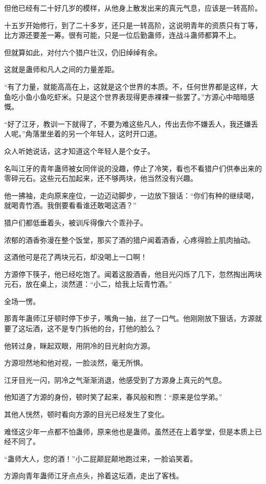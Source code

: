 \begin{this_body}
但他已经有二十好几岁的模样，从他身上散发出来的真元气息，应该是一转高阶。

十五岁开始修行，到了二十多岁，还只是一转高阶，这说明青年的资质只有丁等，比方源还要差一筹。很有可能，只是一位后勤蛊师，连战斗蛊师都算不上。

但就算如此，对付六个猎户壮汉，仍旧绰绰有余。

这就是蛊师和凡人之间的力量差距。

“有了力量，就能高高在上，这就是这个世界的本质。不，任何世界都是这样，大鱼吃小鱼小鱼吃虾米。只是这个世界表现得更赤裸裸一些罢了。”方源心中暗暗感慨。

“好了江牙，教训一下就得了，不要为难这些凡人，传出去你不嫌丢人，我还嫌丢人呢。”角落里坐着的另一个年轻人，这时开口道。

众人听她说话，这才知道这个年轻人是个女子。

名叫江牙的青年蛊师被女同伴说的没趣，停止了冷笑，看也不看猎户们供奉出来的零碎元石。这些元石加起来，还不够两块，他当然没有兴趣。

他一拂袖，走向原来座位，一边迈动脚步，一边放下狠话：“你们有种的继续喝，就喝青竹酒。我倒要看看谁还敢喝这酒？”

猎户们都低垂着头，被训斥得像六个乖孙子。

浓郁的酒香弥漫在整个饭堂，那买了酒的猎户闻着酒香，心疼得脸上肌肉抽动。

这酒他可是花了两块元石，却没喝上一口啊！

方源停下筷子，他已经吃饱了。闻着这股酒香，他目光闪烁了几下，忽然掏出两块元石，放在桌上，淡然道：“小二，给我上坛青竹酒。”

全场一愣。

那青年蛊师江牙顿时停下步子，嘴角一抽，丝了一口气。他刚刚放下狠话，方源就要了这坛酒，这不是专门拆他的台，打他的脸么？

他转过身，眯起双眼，用阴冷的目光射向方源。

方源坦然地和他对视，一脸淡然，毫无所惧。

江牙目光一闪，阴冷之气渐渐消退，他感受到了方源身上真元的气息。

他知道了方源的身份，顿时笑了起来，春风般和煦：“原来是位学弟。”

其他人恍然，顿时看向方源的目光已经发生了变化。

难怪这少年一点都不怕蛊师，原来他也是蛊师。虽然还在上着学堂，但是本质上已经不同了。

“蛊师大人，您的酒！”小二屁颠屁颠地跑过来，一脸谄笑着。

方源向青年蛊师江牙点点头，拎着这坛酒，走出了客栈。

\end{this_body}

